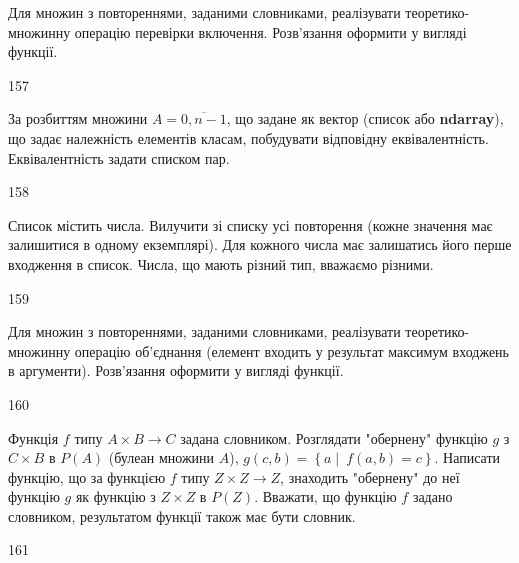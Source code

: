 Для множин з повтореннями, заданими словниками, реалізувати теоретико-множинну операцію перевірки включення. Розв'яз\-ан\-ня оформити у вигляді функції.
\\\par
157 














За розбиттям множини $A=\overline{0,n-1}$, що задане як вектор (список або  \textbf{ndarray}), що задає належність елементів класам, побудувати відповідну еквівалентність. Еквівалентність задати списком пар.
\\\par
158 














Список містить числа. Вилучити зі списку усі повторення (кожне значення має залишитися в одному екземплярі). Для кожного числа має залишатись його перше входження в список. Числа, що мають різний тип, вважаємо різними.
\\\par
159 














Для множин з повтореннями, заданими словниками, реалізувати теоретико-множинну операцію об’єднання (елемент входить у результат максимум входжень в аргументи). Розв’язання оформити у вигляді функції.
\\\par
160 














Функція $f$ типу $A\times B \rightarrow C$ задана словником. Розглядати "обернену" функцію $g$ з $C \times B$  в $P(A)$ (булеан множини $A$), $g\left(c, b\right)=\left\{a\middle|\ f\left(a,b\right)=c\right\}$. Написати функцію, що за функцією $f$ типу $Z\times Z \rightarrow Z$, знаходить "обернену" до неї функцію $g$ як функцію з $Z\times Z$ в $P(Z)$. Вважати, що функцію $f$ задано словником, результатом функції також має бути словник.
\\\par
161 














